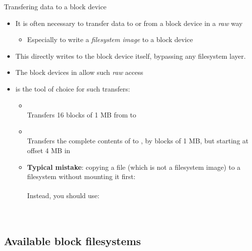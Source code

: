 \begin{frame}{Transfering data to a block device}
  \begin{itemize}
  \item It is often necessary to transfer data to or from a block
    device in a {\em raw} way
    \begin{itemize}
    \item Especially to write a {\em filesystem image} to a block
      device
    \end{itemize}
  \item This directly writes to the block device itself, bypassing any
    filesystem layer.
  \item The block devices in  allow such {\em raw} access
  \item {} is the tool of choice for such transfers:
    \begin{itemize}
    \item {}\\
      Transfers 16 blocks of 1 MB from  to
    \item {}\\
      Transfers the complete contents of  to
      , by blocks of 1 MB, but starting at offset 4 MB
      in 
    \item {\bf Typical mistake}: copying a file (which is not a
          filesystem image) to a filesystem without
          mounting it first:\\
      \\
      Instead, you should use:\\
      \\
      \\
    \end{itemize}
  \end{itemize}
\end{frame}

\subsection{Available block filesystems}

